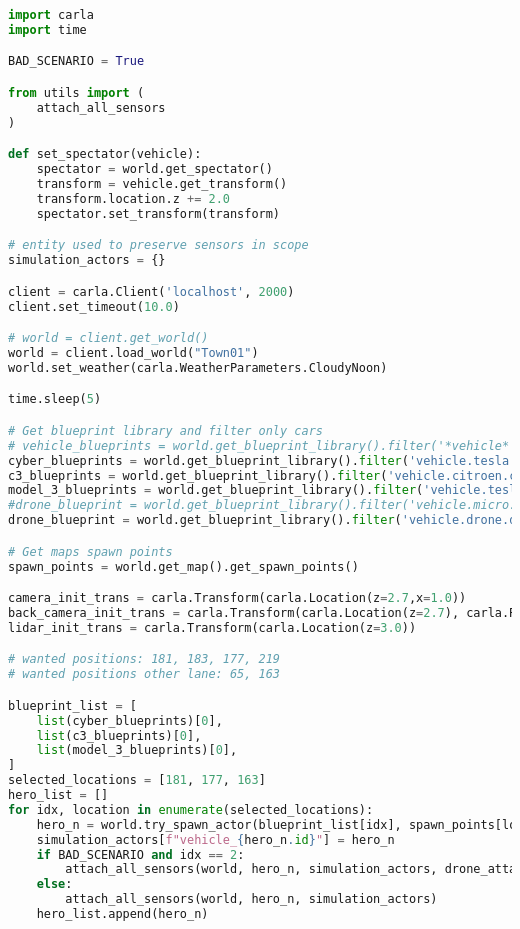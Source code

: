 \begin{lstlisting}[language=Python, caption={Example Use case where data is collected from 3 cars and a drone may be used to perform attacks to the communication channels},label={code:use-case}]
import carla
import time

BAD_SCENARIO = True

from utils import (
    attach_all_sensors
)

def set_spectator(vehicle):
    spectator = world.get_spectator()
    transform = vehicle.get_transform()
    transform.location.z += 2.0
    spectator.set_transform(transform)

# entity used to preserve sensors in scope
simulation_actors = {}

client = carla.Client('localhost', 2000)
client.set_timeout(10.0)

# world = client.get_world()
world = client.load_world("Town01")
world.set_weather(carla.WeatherParameters.CloudyNoon)

time.sleep(5)

# Get blueprint library and filter only cars
# vehicle_blueprints = world.get_blueprint_library().filter('*vehicle*')
cyber_blueprints = world.get_blueprint_library().filter('vehicle.tesla.cybertruck')
c3_blueprints = world.get_blueprint_library().filter('vehicle.citroen.c3')
model_3_blueprints = world.get_blueprint_library().filter('vehicle.tesla.model3')
#drone_blueprint = world.get_blueprint_library().filter('vehicle.micro.microlino')[0]
drone_blueprint = world.get_blueprint_library().filter('vehicle.drone.drone1')[0]

# Get maps spawn points
spawn_points = world.get_map().get_spawn_points()

camera_init_trans = carla.Transform(carla.Location(z=2.7,x=1.0))
back_camera_init_trans = carla.Transform(carla.Location(z=2.7), carla.Rotation(yaw=180))
lidar_init_trans = carla.Transform(carla.Location(z=3.0))

# wanted positions: 181, 183, 177, 219
# wanted positions other lane: 65, 163

blueprint_list = [
    list(cyber_blueprints)[0],
    list(c3_blueprints)[0],
    list(model_3_blueprints)[0],
]
selected_locations = [181, 177, 163]
hero_list = []
for idx, location in enumerate(selected_locations):
    hero_n = world.try_spawn_actor(blueprint_list[idx], spawn_points[location])
    simulation_actors[f"vehicle_{hero_n.id}"] = hero_n
    if BAD_SCENARIO and idx == 2:
        attach_all_sensors(world, hero_n, simulation_actors, drone_attack=True)
    else:
        attach_all_sensors(world, hero_n, simulation_actors)
    hero_list.append(hero_n)



\end{lstlisting}
